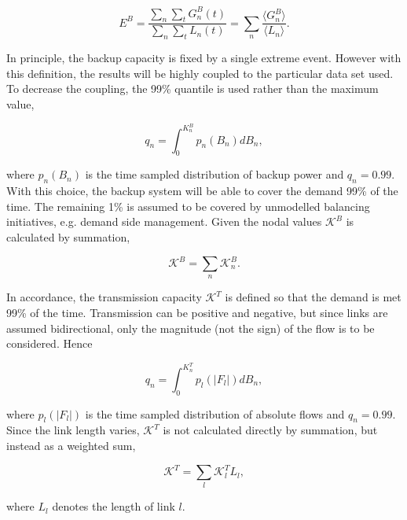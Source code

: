 \documentclass[a4paper, 5p, sort&compress]{elsarticle}%
\begin{document}
\begin{equation}
  \label{eq:backup-energy}
  E^{B} =\frac{\sum_{n} \sum_{t} G^{B}_{n}(t)}{\sum_{n} \sum_{t}
    L_{n}(t)} = \sum_{n} \frac{\langle G^{B}_{n} \rangle}{\langle L_{n}
    \rangle} .
\end{equation}

In principle, the backup capacity is fixed by a single extreme
event. However with this definition, the results will be highly
coupled to the particular data set used. To decrease the coupling, the
99\% quantile is used rather than the maximum value,

\begin{equation}
  \label{eq:2}
  q_{n} = \int _{0} ^{K_{n}^{B}} p_{n}(B_{n})dB_{n},
\end{equation}

where $p_{n}(B_{n})$ is the time sampled distribution of backup power
and $q_{n} = 0.99$. With this choice, the backup system will be able
to cover the demand 99\% of the time. The remaining 1\% is assumed to
be covered by unmodelled balancing initiatives, e.g. demand side
management. Given the nodal values $\mathcal{K}^{B}$ is calculated by
summation,

\begin{equation}
  \label{eq:4}
  \mathcal{K}^{B} = \sum_{n} \mathcal{K}^{B}_{n} .
\end{equation}

In accordance, the transmission capacity $\mathcal{K}^{T}$ is defined
so that the demand is met 99\% of the time. Transmission can be
positive and negative, but since links are assumed bidirectional, only
the magnitude (not the sign) of the flow is to be considered. Hence

\begin{equation}
  \label{eq:2}
  q_{n} = \int _{0} ^{K_{n}^{T}} p_{l}(|F_{l}|)dB_{n},
\end{equation}

where $p_{l}(|F_{l}|)$ is the time sampled distribution of absolute
flows and $q_{n} = 0.99$. Since the link length varies,
$\mathcal{K}^{T}$ is not calculated directly by summation, but instead
as a weighted sum,

\begin{equation}
  \label{eq:4}
  \mathcal{K}^{T} = \sum_{l} \mathcal{K}^{T}_{l} L_{l},
\end{equation}

where $L_{l}$ denotes the length of link $l$.
\end{document}
